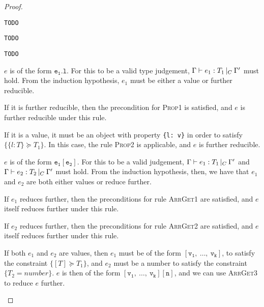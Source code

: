\documentclass[a4paper]{article}
\theoremstyle{dotless}
\begin{document}
\begin{proof}
  \begin{case}[Fun3]\label{fun3}
	\texttt{TODO}
  \end{case}

  \begin{case}[Fun4]\label{fun4}
	\texttt{TODO}
  \end{case}

  \begin{case}[IDType]\label{idtype}
	\texttt{TODO}
  \end{case}

  \begin{case}[PropType]\label{proptype}

	$e$ is of the form $\mathtt{e_1.l}$. For this to be a valid type
	judgement, $\Gamma{}\vdash e_1: T_1\,|_C\:\Gamma'$ must hold. From the induction
	hypothesis, $e_1$ must be either a value or further reducible.

	If it is further reducible, then the precondition for \textsc{Prop1} is
	satisfied, and $e$ is further reducible under this rule.

	If it is a value, it must be an object with property \texttt{\{l: v\}}
	in order to satisfy $\{\{l:T\}\succeq T_1\}$. In this case, the rule
	\textsc{Prop2} is applicable, and $e$ is further reducible.

  \end{case}

  \begin{case}[ArrayType]\label{arraytype}

	$e$ is of the form $\mathtt{e_1[e_2]}$. For this to be a valid
	judgement, $\Gamma{}\vdash e_1: T_1\,|_C\:\Gamma'$ and $\Gamma{}\vdash e_2: T_2\,|_C\:\Gamma'$ must hold. From
	the induction hypothesis, then, we have that $e_1$ and $e_2$ are both
	either values or reduce further.

	\begin{subcase}
	  If $e_1$ reduces further, then the preconditions for rule
	  \textsc{ArrGet1} are satisfied, and $e$ itself reduces further under
	  this rule.
	\end{subcase}

	If $e_2$ reduces further, then the preconditions for rule
	\textsc{ArrGet2} are satisfied, and $e$ itself reduces further under
	this rule.

	If both $e_1$ and $e_2$ are values, then $e_1$ must be of the form 
	$\mathtt{[v_1,\ \dots,\ v_k]}$, to satisfy the constraint $\{[T] \succeq T_1\}$,
	and $e_2$ must be a number to satisfy the constraint $\{T_2=number\}$.
	$e$ is then of the form $\mathtt{[v_1,\ \dots,\ v_k][n]}$, and we 
	can use \textsc{ArrGet3} to reduce $e$ further.


\end{case}
\end{proof}
\end{document}
